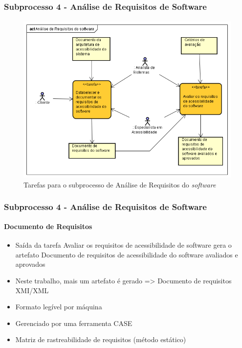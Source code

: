 \documentclass{beamer}
\begin{document}
\begin{frame}
\frametitle{Subprocesso 4 - Análise de Requisitos de Software}
\framesubtitle{}

\begin{figure}[htbp] \centering
	\includegraphics[width=\textwidth,height=.65\textheight,keepaspectratio]{./img/subprocesso4.png}
	\caption{Tarefas para o subprocesso de Análise de Requisitos do \textit{software} \citep{maia:10}}
	\label{fig:sub4}
\end{figure}

\end{frame}

\begin{frame}
\frametitle{Subprocesso 4 - Análise de Requisitos de Software}
\framesubtitle{Documento de Requisitos}

\begin{itemize}
  \item Saída da tarefa Avaliar os requisitos de acessibilidade de software gera o artefato Documento de requisitos de acessibilidade do software avaliados e aprovados
  \item Neste trabalho, mais um artefato é gerado => Documento de requisitos XMI/XML
  \item Formato legível por máquina
  \item Gerenciado por uma ferramenta CASE
  \item Matriz de rastreabilidade de requisitos (método estático) \citep{guo:2009:OBI:1681515.1682933}
\end{itemize}

\end{frame}
\end{document}
